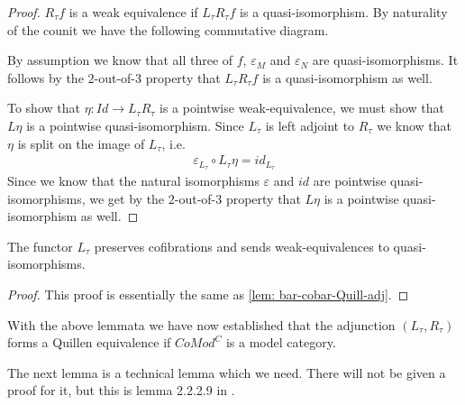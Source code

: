 \documentclass[../thesis.tex]{subfiles}
\begin{document}
            \begin{proof}
                $R_\tau f$ is a weak equivalence if $L_\tau R_\tau f$ is a quasi-isomorphism. By naturality of the counit we have the following commutative diagram.
                \begin{center}
                \end{center}

                By assumption we know that all three of $f$, $\varepsilon_M$ and $\varepsilon_N$ are quasi-isomorphisms. It follows by the $2$-out-of-$3$ property that $L_\tau R_\tau f$ is a quasi-isomorphism as well.

                To show that $\eta : Id \rightarrow L_\tau R_\tau$ is a pointwise weak-equivalence, we must show that $L\eta$ is a pointwise quasi-isomorphism. Since $L_\tau$ is left adjoint to $R_\tau$ we know that $\eta$ is split on the image of $L_\tau$, i.e.
                \begin{align*}
                    \varepsilon_{L_\tau}\circ L_\tau\eta = id_{L_\tau}
                \end{align*}
                Since we know that the natural isomorphisms $\varepsilon$ and $id$ are pointwise quasi-isomorphisms, we get by the $2$-out-of-$3$ property that $L\eta$ is a pointwise quasi-isomorphism as well.
            \end{proof}

            \begin{lemma}
                The functor $L_\tau$ preserves cofibrations and sends weak-equivalences to quasi-isomorphisms.
            \end{lemma}

            \begin{proof}
                This proof is essentially the same as \ref{lem: bar-cobar-Quill-adj}.
            \end{proof}

            With the above lemmata we have now established that the adjunction $(L_\tau, R_\tau)$ forms a Quillen equivalence if $CoMod^C$ is a model category.

            The next lemma is a technical lemma which we need. There will not be given a proof for it, but this is lemma 2.2.2.9 in \cite{LefevreHasegawa03}.
\end{document}
